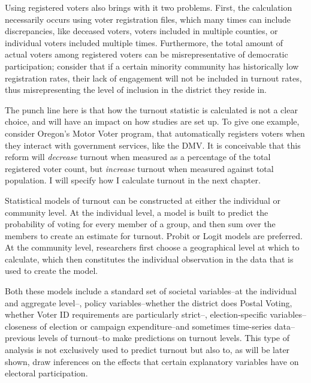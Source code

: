 \documentclass[12pt,twoside]{reedthesis}
\begin{document}
  Using registered voters also brings with it two problems. First, the
  calculation necessarily occurs using voter registration files, which
  many times can include discrepancies, like deceased voters, voters
  included in multiple counties, or individual voters included multiple
  times. Furthermore, the total amount of actual voters among registered
  voters can be misrepresentative of democratic participation; consider
  that if a certain minority community has historically low registration
  rates, their lack of engagement will not be included in turnout rates,
  thus misrepresenting the level of inclusion in the district they reside
  in.
  
  The punch line here is that how the turnout statistic is calculated is
  not a clear choice, and will have an impact on how studies are set up.
  To give one example, consider Oregon's Motor Voter program, that
  automatically registers voters when they interact with government
  services, like the DMV. It is conceivable that this reform will
  \emph{decrease} turnout when measured as a percentage of the total
  registered voter count, but \emph{increase} turnout when measured
  against total population. I will specify how I calculate turnout in the
  next chapter.
  
  Statistical models of turnout can be constructed at either the
  individual or community level. At the individual level, a model is built
  to predict the probability of voting for every member of a group, and
  then sum over the members to create an estimate for turnout. Probit or
  Logit models are preferred. At the community level, researchers first
  choose a geographical level at which to calculate, which then
  constitutes the individual observation in the data that is used to
  create the model.
  
  Both these models include a standard set of societal variables--at the
  individual and aggregate level--, policy variables--whether the district
  does Postal Voting, whether Voter ID requirements are particularly
  strict--, election-specific variables--closeness of election or campaign
  expenditure--and sometimes time-series data--previous levels of
  turnout--to make predictions on turnout levels. This type of analysis is
  not exclusively used to predict turnout but also to, as will be later
  shown, draw inferences on the effects that certain explanatory variables
  have on electoral participation.
  
\end{document}
